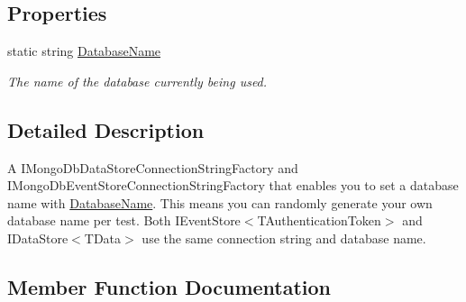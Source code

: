 \subsection*{Properties}
\begin{DoxyCompactItemize}
\item 
static string \hyperlink{classCqrs_1_1Ninject_1_1MongoDB_1_1TestMongoDbDataStoreConnectionStringFactory_a53412e87f2114b8a61d6898f7f290187_a53412e87f2114b8a61d6898f7f290187}{Database\+Name}
\begin{DoxyCompactList}\small\item\em The name of the database currently being used. \end{DoxyCompactList}\end{DoxyCompactItemize}


\subsection{Detailed Description}
A I\+Mongo\+Db\+Data\+Store\+Connection\+String\+Factory and I\+Mongo\+Db\+Event\+Store\+Connection\+String\+Factory that enables you to set a database name with \hyperlink{classCqrs_1_1Ninject_1_1MongoDB_1_1TestMongoDbDataStoreConnectionStringFactory_a53412e87f2114b8a61d6898f7f290187_a53412e87f2114b8a61d6898f7f290187}{Database\+Name}. This means you can randomly generate your own database name per test. Both I\+Event\+Store$<$\+T\+Authentication\+Token$>$ and I\+Data\+Store$<$\+T\+Data$>$ use the same connection string and database name. 



\subsection{Member Function Documentation}
\mbox{\label{classCqrs_1_1Ninject_1_1MongoDB_1_1TestMongoDbDataStoreConnectionStringFactory_abc9f81219c65af4182635cd545282b65_abc9f81219c65af4182635cd545282b65}} 

